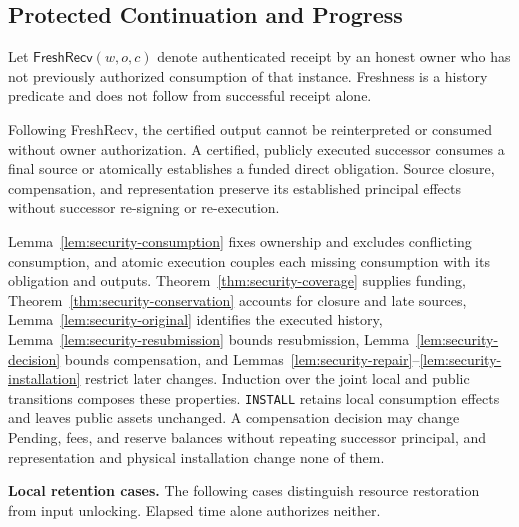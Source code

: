\subsection{Protected Continuation and Progress}
\label{sec:security-composition}

Let $\mathsf{FreshRecv}(w,o,c)$ denote authenticated receipt by an honest owner who has not previously authorized consumption of that instance. Freshness is a history predicate and does not follow from successful receipt alone.

\begin{theorem}
\label{thm:security-continuation}
Following FreshRecv, the certified output cannot be reinterpreted or
consumed without owner authorization. A certified, publicly executed
successor consumes a final source or atomically establishes a funded
direct obligation. Source closure, compensation, and representation
preserve its established principal effects without successor re-signing
or re-execution.
\end{theorem}
\begin{IEEEproof}
Lemma~\ref{lem:security-consumption} fixes ownership and excludes conflicting consumption, and atomic execution couples each missing consumption with its obligation and outputs. Theorem~\ref{thm:security-coverage} supplies funding, Theorem~\ref{thm:security-conservation} accounts for closure and late sources, Lemma~\ref{lem:security-original} identifies the executed history, Lemma~\ref{lem:security-resubmission} bounds resubmission, Lemma~\ref{lem:security-decision} bounds compensation, and Lemmas~\ref{lem:security-repair}--\ref{lem:security-installation} restrict later changes. Induction over the joint local and public transitions composes these properties. \texttt{INSTALL} retains local consumption effects and leaves public assets unchanged. A compensation decision may change Pending, fees, and reserve balances without repeating successor principal, and representation and physical installation change none of them.
\end{IEEEproof}

\noindent\textbf{Local retention cases.}
The following cases distinguish resource restoration from input
unlocking. Elapsed time alone authorizes neither.

